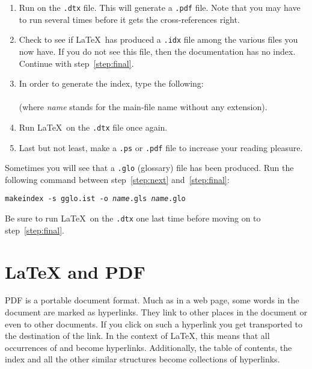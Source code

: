 \begin{enumerate}
\item Run  on the \texttt{.dtx} file.  This will generate a
  \texttt{.pdf} file. Note that you may have to run 
  several times before it gets the cross-references right.
\item Check to see if \LaTeX\ has produced a \texttt{.idx} file
  among the various files you now have.
  If you do not see this file, then the documentation has no index. Continue
  with step~\ref{step:final}.
\item In order to generate the index, type the following:\\
        \\
        (where \textit{name} stands for the main-file name without any
    extension).
 \item Run \LaTeX\ on the \texttt{.dtx} file once again.\label{step:next}

\item Last but not least, make a \texttt{.ps} or \texttt{.pdf}
  file to increase your reading pleasure.\label{step:final}

\end{enumerate}

Sometimes you will see that a \texttt{.glo}
(glossary) file has been produced. Run the following
command between
step~\ref{step:next} and~\ref{step:final}:

\noindent\texttt{makeindex -s gglo.ist -o \textit{name}.gls \textit{name}.glo}

\noindent Be sure to run \LaTeX\ on the \texttt{.dtx} one last
time before moving on to step~\ref{step:final}.



\section{\LaTeX{} and PDF}\label{sec:pdftex}
%
PDF is a portable  document format. Much as in a web page,
some words in the document are marked as hyperlinks. They link to other
places in the document or even to other documents. If you click
on such a hyperlink you get transported to the destination of the
link. In the context of \LaTeX{}, this means that all occurrences of
 and  become hyperlinks. Additionally, the table
of contents, the index and all the other similar structures become
collections of hyperlinks.

